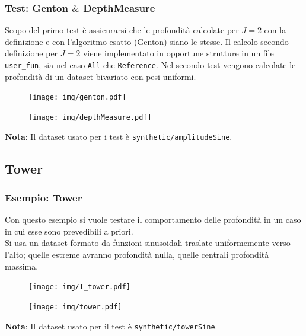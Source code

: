 \documentclass[9pt]{beamer}
\begin{document}
\begin{frame}
\frametitle{Test: Genton $\&$ DepthMeasure} 
Scopo del primo test \`e assicurarsi che le profondit\`a calcolate per $J=2$ con la definizione e con l'algoritmo esatto (Genton) siano le stesse.
Il calcolo secondo definizione per $J=2$ viene implementato in opportune strutture in un file \texttt{user\_fun}, sia nel caso \texttt{All} che \texttt{Reference}.
Nel secondo test vengono calcolate le profondit\`a di un dataset bivariato con pesi uniformi.
\begin{figure}
\begin{minipage}{0.45\textwidth}
  \centering
  \texttt{[image: img/genton.pdf]}  
\end{minipage}
\hspace{0.2cm}
\begin{minipage}{0.45\textwidth}
 \centering
 \texttt{[image: img/depthMeasure.pdf]}
\end{minipage}
\end{figure}

\textbf{Nota}:
Il dataset usato per i test \`e \texttt{synthetic/amplitudeSine}.
\end{frame}


\subsection{Tower}

\begin{frame}
\frametitle{Esempio: Tower}
Con questo esempio si vuole testare il comportamento delle profondit\`a in un caso in cui esse sono
prevedibili a priori.\\
Si usa un dataset formato da funzioni sinusoidali traslate uniformemente verso l'alto; quelle estreme
avranno profondit\`a nulla, quelle centrali profondit\`a massima.

\begin{figure}
 \begin{minipage}{0.4\textwidth}
  \centering
  \texttt{[image: img/I\_tower.pdf]}
 \end{minipage}
 \hspace{0.3cm}
 \begin{minipage}{0.55\textwidth}
  \centering 
  \texttt{[image: img/tower.pdf]}
 \end{minipage}
\end{figure}

\textbf{Nota}:
Il dataset usato per il test \`e \texttt{synthetic/towerSine}.

\end{frame}
\end{document}
